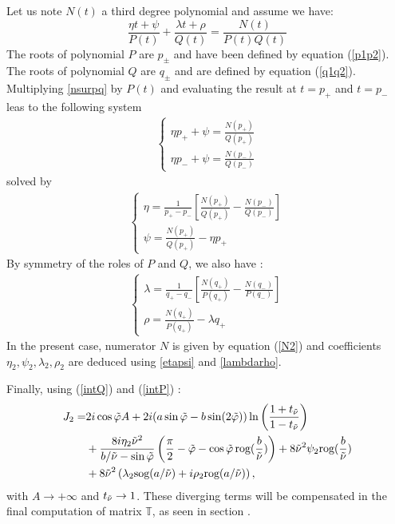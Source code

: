 Let us note $N(t)$ a third degree polynomial and assume we have:
\begin{equation}
\frac{\eta t+\psi}{P(t)}+\frac{\lambda t+\rho}{Q(t)}=\frac{N(t)}{P(t)Q(t)}
\label{nsurpq}
\end{equation}
The roots of polynomial $P$ are $p_\pm$ and have been defined by equation (\ref{p1p2}). The roots of polynomial $Q$ are $q_\pm$ and are defined by equation (\ref{q1q2}). Multiplying \eqref{nsurpq} by $P(t)$ and evaluating the result at $t=p_+$ and $t=p_-$ leas to the following system
\begin{eqnarray}
\left\{
\begin{array}{l}
\eta p_+ +\psi=\frac{N(p_+)}{Q(p_+)}\\
\eta p_- +\psi=\frac{N(p_-)}{Q(p_-)}
\end{array}
\right.
\end{eqnarray}
solved by
\begin{eqnarray}
\left\{
\begin{array}{l}
\eta=\frac{1}{p_+-p_-}\left[ \frac{N(p_+)}{Q(p_+)}-\frac{N(p_-)}{Q(p_-)} \right] \\
\psi=\frac{N(p_+)}{Q(p_+)}-\eta p_+
\end{array}
\right.
\label{etapsi}
\end{eqnarray}
By symmetry of the roles of $P$ and $Q$, we also have :
\begin{eqnarray}
\left\{
\begin{array}{l}
\lambda=\frac{1}{q_+-q_-}\left[ \frac{N(q_+)}{P(q_+)}-\frac{N(q_-)}{P(q_-)} \right] \\
\rho=\frac{N(q_+)}{P(q_+)}-\lambda q_+
\end{array}
\right.
\label{lambdarho}
\end{eqnarray}
In the present case, numerator $N$ is given by equation (\ref{N2}) and coefficients $\eta_2,\psi_2,\lambda_2,\rho_2$ are deduced using \eqref{etapsi} and \eqref{lambdarho}.

Finally, using (\ref{intQ}) and (\ref{intP}) :
\begin{equation}
\begin{split}
J_2= &2i\cos\tilde{\varphi} A+2i(a\sin\tilde{\varphi}-b\sin(2\tilde{\varphi}))\ln\left(\frac{1+t_{\tilde{\nu}}}{1-t_{\tilde{\nu}}} \right) \\
&+\frac{8i\eta_2\tilde{\nu}^2}{b/\tilde{\nu}-\sin\tilde{\varphi}}\left(\frac{\pi}{2}-\tilde{\varphi}-\cos\tilde{\varphi}\,\mbox{rog}(\frac{b}{\tilde{\nu}}) \right)+8\tilde{\nu}^2\psi_2 \mbox{rog}(\frac{b}{\tilde{\nu}} )\\
&+8\tilde{\nu}^2 \left(\lambda_2 \mbox{sog}(a/\tilde{\nu})+i\rho_2 \mbox{rog}(a/\tilde{\nu}) \right),
\end{split}
\label{valJ2}
\end{equation}
with $A\rightarrow +\infty$ and $t_{\tilde{\nu}}\rightarrow 1$. These diverging terms will be compensated in the final computation of matrix $\mathbb{T}$, as seen in section \label{calcI3}.

